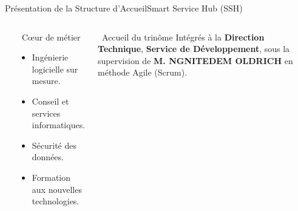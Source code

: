 \begin{frame}{Présentation de la Structure d'Accueil}{Smart Service Hub (SSH)}
  \vspace{0.4cm}
  \begin{columns}[c]
      \begin{center}
      \end{center}

      \begin{block}{\faBullseye\ Cœur de métier}
        \begin{itemize}
          \setlength{\itemsep}{8pt}
          \item Ingénierie logicielle sur mesure.
          \item Conseil et services informatiques.
          \item Sécurité des données.
          \item Formation aux nouvelles technologies.
        \end{itemize}
      \end{block}
      \vspace{0.2cm}
      \begin{block}{\faHandshake\ Accueil du trinôme}
        \footnotesize
        Intégrés à la \textbf{Direction Technique}, \textbf{Service de Développement}, sous la supervision de \textbf{M. NGNITEDEM OLDRICH} en méthode Agile (Scrum).
      \end{block}
  \end{columns}
\end{frame}